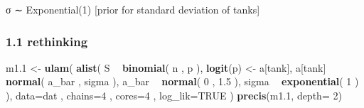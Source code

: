 \documentclass[
]{article}
\newenvironment{Shaded}{\begin{snugshade}}{\end{snugshade}}
\newcommand{\DataTypeTok}[1]{\textcolor[rgb]{0.13,0.29,0.53}{#1}}
\newcommand{\DecValTok}[1]{\textcolor[rgb]{0.00,0.00,0.81}{#1}}
\newcommand{\FloatTok}[1]{\textcolor[rgb]{0.00,0.00,0.81}{#1}}
\newcommand{\KeywordTok}[1]{\textcolor[rgb]{0.13,0.29,0.53}{\textbf{#1}}}
\newcommand{\NormalTok}[1]{#1}
\newcommand{\OperatorTok}[1]{\textcolor[rgb]{0.81,0.36,0.00}{\textbf{#1}}}
\newcommand{\OtherTok}[1]{\textcolor[rgb]{0.56,0.35,0.01}{#1}}
\newcommand{\StringTok}[1]{\textcolor[rgb]{0.31,0.60,0.02}{#1}}
\begin{document}
σ ∼ Exponential(1) {[}prior for standard deviation of tanks{]}

\hypertarget{rethinking}{%
\subsubsection{1.1 rethinking}\label{rethinking}}

\begin{Shaded}
\end{Shaded}

\begin{Shaded}
\begin{Highlighting}[]
\NormalTok{m1}\FloatTok{.1}\NormalTok{ <-}\StringTok{ }\KeywordTok{ulam}\NormalTok{( }\KeywordTok{alist}\NormalTok{(}
\NormalTok{S }\OperatorTok{~}\StringTok{ }\KeywordTok{binomial}\NormalTok{( n , p ),}
\KeywordTok{logit}\NormalTok{(p) <-}\StringTok{ }\NormalTok{a[tank],}
\NormalTok{a[tank] }\OperatorTok{~}\StringTok{ }\KeywordTok{normal}\NormalTok{( a_bar , sigma ), }
\NormalTok{a_bar }\OperatorTok{~}\StringTok{ }\KeywordTok{normal}\NormalTok{( }\DecValTok{0}\NormalTok{ , }\FloatTok{1.5}\NormalTok{ ),}
\NormalTok{sigma }\OperatorTok{~}\StringTok{ }\KeywordTok{exponential}\NormalTok{( }\DecValTok{1}\NormalTok{ )}
\NormalTok{), }\DataTypeTok{data=}\NormalTok{dat , }\DataTypeTok{chains=}\DecValTok{4}\NormalTok{ , }\DataTypeTok{cores=}\DecValTok{4}\NormalTok{ , }\DataTypeTok{log_lik=}\OtherTok{TRUE}\NormalTok{ )}
\KeywordTok{precis}\NormalTok{(m1}\FloatTok{.1}\NormalTok{, }\DataTypeTok{depth=} \DecValTok{2}\NormalTok{)}
\end{Highlighting}
\end{Shaded}
\end{document}
